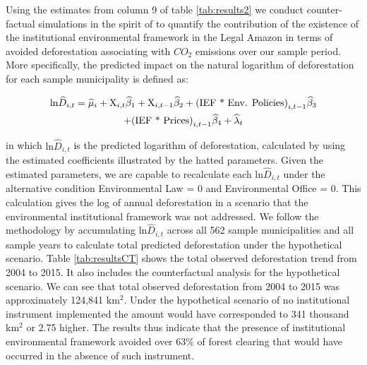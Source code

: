 Using the estimates from column 9 of table \ref{tab:results2} we conduct counter-factual simulations in the spirit of \citet{assuncao2015} to quantify the contribution of the existence of the institutional environmental framework in the Legal Amazon in terms of avoided deforestation associating with $CO_{2}$ emissions over our sample period. More specifically, the predicted impact on the natural logarithm of deforestation for each sample municipality is defined as:

\begin{equation}
\begin{gathered}
   \text{ln} \widehat{D}_{i,t} = \widehat{\mu}_{i} + \text{X}_{i,t}\widehat{\beta}_{1} + \text{X}_{i,t-1}\widehat{\beta}_{2} + \text{(IEF * Env. Policies)}_{i,t-1}\widehat{\beta}_{3} \\ 
   + \text{(IEF * Prices)}_{i,t-1}\widehat{\beta}_{4} + \widehat{\lambda}_{t} \label{eq:3} \\
\end{gathered}
\raisetag{2\normalbaselineskip}
\end{equation}

in which $\text{ln} \widehat{D}_{i,t}$ is the predicted logarithm of deforestation, calculated by using the estimated coefficients illustrated by the hatted parameters. Given the estimated parameters, we are capable to recalculate each  $\text{ln} \widehat{D}_{i,t}$ under the alternative condition Environmental Law = 0 and Environmental Office = 0. This calculation gives the log of annual deforestation in a scenario that the environmental institutional framework was not addressed. We follow the \citet{assuncao2015} methodology by accumulating $\text{ln} \widehat{D}_{i,t}$ across all 562 sample municipalities and all sample years to calculate total predicted deforestation under the hypothetical scenario.
Table \ref{tab:resultsCT} shows the total observed deforestation trend from 2004 to 2015. It also includes the counterfactual analysis for the hypothetical scenario. We can see that total observed deforestation from 2004 to 2015 was approximately 124,841 km$^{2}$. Under the hypothetical scenario of no institutional instrument implemented the amount would have corresponded to 341 thousand km$^{2}$ or 2.75 higher. The results thus indicate that the presence of institutional environmental framework avoided over 63$\%$ of forest clearing that would have occurred in the absence of such instrument.

